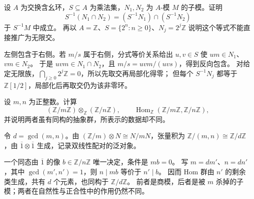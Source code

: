 \begin{exercise}\label{g5:ex:localization-finite-intersection}
	设 \(A\) 为交换含幺环，\(S\subseteq A\) 为乘法集，\(N_1,N_2\) 为 \(A\)-模 \(M\) 的子模。证明
	\[
	S^{-1}(N_1\cap N_2)
	=(S^{-1}N_1)\cap(S^{-1}N_2)
	\]
	于 \(S^{-1}M\) 中成立。 再以 \(A=\mathbb Z\)、\(S=\{2^n:n\geq0\}\)、\(N_j=2^j\mathbb Z\) 说明这个等式不能直接推广为无限交。
\end{exercise}
\begin{solution}
	左侧包含于右侧。若 \(m/s\) 属于右侧，分式等价关系给出 \(u,v\in S\) 使 \(um\in N_1\)、\(vm\in N_2\)。 于是 \(uvm\in N_1\cap N_2\)，且 \(m/s=uvm/(uvs)\)，得到反向包含。 对给定无限族，\(\bigcap_{j\geq0}2^j\mathbb Z=0\)，所以先取交再局部化得零； 但每个 \(S^{-1}N_j\) 都等于 \(\mathbb Z[1/2]\)，局部化后再取交仍为该非零环。
\end{solution}

\begin{exercise}\label{g5:ex:tensor-hom-cyclic}
	设 \(m,n\) 为正整数。计算
	\[
	(\mathbb Z/m\mathbb Z)\otimes_{\mathbb Z}(\mathbb Z/n\mathbb Z),
	\qquad
	\operatorname{Hom}_{\mathbb Z}(\mathbb Z/m\mathbb Z,\mathbb Z/n\mathbb Z),
	\]
	并说明两者虽有同构的抽象群，所表示的数据却不同。
\end{exercise}
\begin{solution}
	令 \(d=\gcd(m,n)\)。由 \((\mathbb Z/m)\otimes N\cong N/mN\)，张量积为 \(\mathbb Z/(m,n)\cong\mathbb Z/d\mathbb Z\)，由 \(\overline1\otimes\overline1\) 生成，记录双线性配对的泛对象。

	一个同态由 \(\overline1\) 的像 \(b\in\mathbb Z/n\mathbb Z\) 唯一决定，条件是 \(mb=0\)。 写 \(m=dm'\)、\(n=dn'\)，其中 \(\gcd(m',n')=1\)，则 \(n\mid mb\) 等价于 \(n'\mid b\)。 因而 Hom 群由 \(n'\) 的剩余类生成，共有 \(d\) 个元素，也同构于 \(\mathbb Z/d\mathbb Z\)。 前者是商模，后者是被 \(m\) 杀掉的子模；两者在自然性与正合性中的作用仍然不同。
\end{solution}

